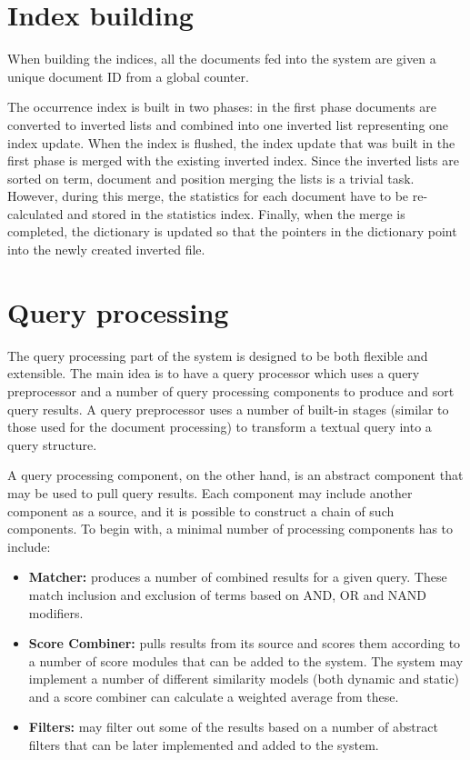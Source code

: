 \section{Index building}\label{sub:index_building}
When building the indices, all the documents fed into the system are given a unique document ID from a global counter.

The occurrence index is built in two phases: in the first phase documents are converted to inverted lists and combined into one inverted list representing one index update. When the index is flushed, the index update that was built in the first phase is merged with the existing inverted index. Since the inverted lists are sorted on term, document and position merging the lists is a trivial task. However, during this merge, the statistics for each document have to be re-calculated and stored in the statistics index. Finally, when the merge is completed, the dictionary is updated so that the pointers in the dictionary point into the newly created inverted file.

\section{Query processing}
The query processing part of the system is designed to be both flexible and extensible. The main idea is to have a query processor which uses a query preprocessor and a number of query processing components to produce and sort query results. A query preprocessor uses a number of built-in stages (similar to those used for the document processing) to transform a textual query into a query structure.

A query processing component, on the other hand, is an abstract component that may be used to pull query results. Each component may include another component as a source, and it is possible to construct a chain of such components. To begin with, a minimal number of processing components has to include:
\begin{itemize}
	\item {\bf Matcher:} produces a number of combined results for a given query. These match inclusion and exclusion of terms based on AND, OR and NAND modifiers.
	\item {\bf Score Combiner:} pulls results from its source and scores them according to a number of score modules that can be added to the system. The system may implement a number of different similarity models (both dynamic and static) and a score combiner can calculate a weighted average from these.
	\item {\bf Filters:} may filter out some of the results based on a number of abstract filters that can be later implemented and added to the system.
\end{itemize}

